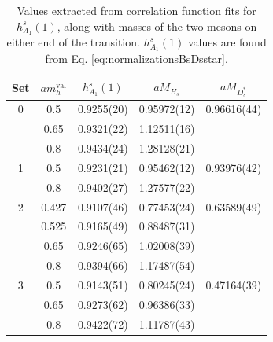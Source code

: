 \begin{table}
\begin{center}
\begin{tabular}{ c c c c c }
\hline
Set & $am_h^{\text{val}}$ & $h^s_{A_1}(1)$& $aM_{H_s}$& $aM_{D^*_s}$\\ [0.5ex]
\hline
0 & 0.5 & 0.9255(20) & 0.95972(12) & 0.96616(44)\\ [0.5ex] 
 & 0.65 & 0.9321(22) & 1.12511(16) & \\ [0.5ex] 
 & 0.8 & 0.9434(24) & 1.28128(21) & \\ [0.5ex] 
\hline
1 & 0.5 & 0.9231(21) & 0.95462(12) & 0.93976(42)\\ [0.5ex] 
 & 0.8 & 0.9402(27) & 1.27577(22) & \\ [0.5ex] 
\hline
2 & 0.427 & 0.9107(46) & 0.77453(24) & 0.63589(49)\\ [0.5ex] 
 & 0.525 & 0.9165(49) & 0.88487(31) & \\ [0.5ex] 
 & 0.65 & 0.9246(65) & 1.02008(39) & \\ [0.5ex] 
 & 0.8 & 0.9394(66) & 1.17487(54) & \\ [0.5ex] 
\hline
3 & 0.5 & 0.9143(51) & 0.80245(24) & 0.47164(39)\\ [0.5ex] 
 & 0.65 & 0.9273(62) & 0.96386(33) & \\ [0.5ex] 
 & 0.8 & 0.9422(72) & 1.11787(43) & \\ [0.5ex] 
\hline
\end{tabular}
\caption{Values extracted from correlation function fits for $h^s_{A_1}(1)$, along with masses of the two mesons on either end of the transition. $h^s_{A_1}(1)$ values are found from Eq. \eqref{eq:normalizationsBsDsstar}. \label{tab:results_BsDsstar}}
\end{center}
\end{table}

